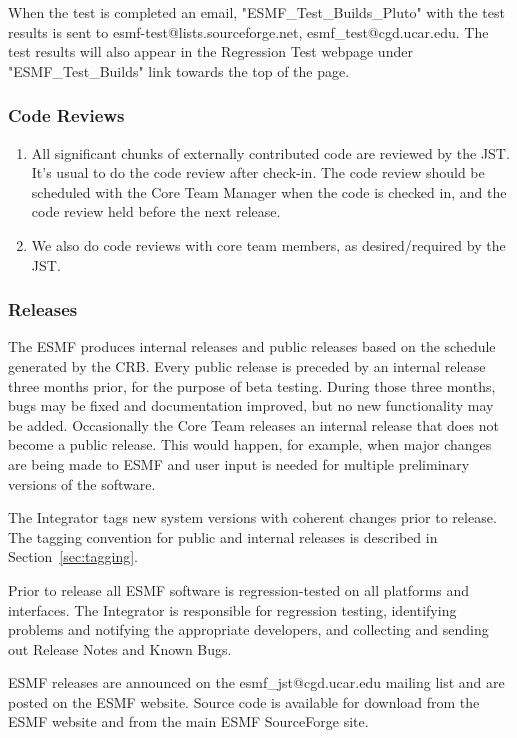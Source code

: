 When the test is completed an email, "ESMF\_Test\_Builds\_Pluto" with the test results is sent to 
esmf-test@lists.sourceforge.net, esmf\_test@cgd.ucar.edu.
The test results will also appear in the Regression Test webpage under "ESMF\_Test\_Builds"
link towards the top of the page.

\subsubsection{Code Reviews}
\begin{enumerate}
\item All significant chunks of externally contributed code are reviewed
by the JST. It's usual to do the code review after check-in. The code review should
be scheduled with the Core Team Manager when the code is checked in, and
the code review held before the next release.
\item We also do code reviews with core team members, as desired/required
by the JST. 
\end{enumerate}

\subsubsection {Releases}

The ESMF produces internal releases and public releases based
on the schedule generated by the CRB.  Every public release
is preceded by an internal release three months prior, for the
purpose of beta testing.  During those three months, bugs may be
fixed and documentation improved, but no new functionality may be
added.  Occasionally the Core Team releases an internal release
that does not become a public release.  This would happen, for 
example, when major changes are being made to ESMF and user
input is needed for multiple preliminary versions of the software.

The Integrator tags new system versions with coherent changes prior
to release.  The tagging convention for public and internal releases is
described in Section~\ref{sec:tagging}.  

Prior to release all ESMF software is regression-tested on all platforms
and interfaces.  The Integrator is responsible for regression testing,
identifying problems and notifying the appropriate developers, and 
collecting and sending out Release Notes and Known Bugs.

ESMF releases are announced
on the esmf\_jst@cgd.ucar.edu mailing list and are posted on the ESMF
website.  Source code is available for download from the ESMF
website and from the main ESMF SourceForge site.

